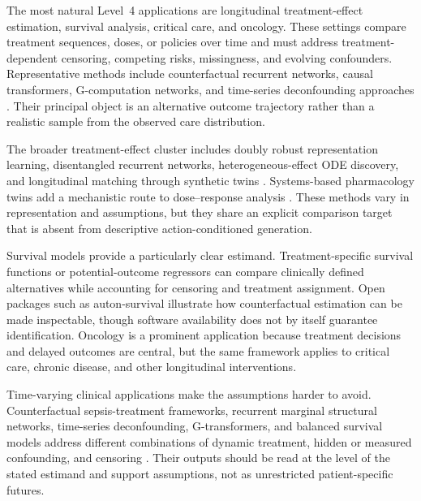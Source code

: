 The most natural Level~4 applications are longitudinal treatment-effect estimation, survival analysis, critical care, and oncology. These settings compare treatment sequences, doses, or policies over time and must address treatment-dependent censoring, competing risks, missingness, and evolving confounders. Representative methods include counterfactual recurrent networks, causal transformers, G-computation networks, and time-series deconfounding approaches \citep{Bica2020CRN,Melnychuk2022CausalTransformer,Li2020GNet,Seedat2022TECDE}. Their principal object is an alternative outcome trajectory rather than a realistic sample from the observed care distribution.

The broader treatment-effect cluster includes doubly robust representation learning, disentangled recurrent networks, heterogeneous-effect ODE discovery, and longitudinal matching through synthetic twins \citep{Zeng2020DoubleRobustRepresentation,Berrevoets2021DisentangledCounterfactualRecurrent,Kacprzyk2024OdeDiscoveryLongitudinal,Qian2021SynctwinTreatmentEffect}. Systems-based pharmacology twins add a mechanistic route to dose--response analysis \citep{Susilo2023Systemsbaseddigital}. These methods vary in representation and assumptions, but they share an explicit comparison target that is absent from descriptive action-conditioned generation.

Survival models provide a particularly clear estimand. Treatment-specific survival functions or potential-outcome regressors can compare clinically defined alternatives while accounting for censoring and treatment assignment. Open packages such as auton-survival illustrate how counterfactual estimation can be made inspectable, though software availability does not by itself guarantee identification. Oncology is a prominent application because treatment decisions and delayed outcomes are central, but the same framework applies to critical care, chronic disease, and other longitudinal interventions.

Time-varying clinical applications make the assumptions harder to avoid. Counterfactual sepsis-treatment frameworks, recurrent marginal structural networks, time-series deconfounding, G-transformers, and balanced survival models address different combinations of dynamic treatment, hidden or measured confounding, and censoring \citep{Jeter2021LearningTreatHypotensive,Lim2018ForecastingTreatmentResponses,Bica2020TimeSeriesDeconfounder,Xiong2024GTransformerCounterfactual,Chapfuwa2021EnablingCounterfactualSurvival,Nagpal2022autonsurvivalOpen}. Their outputs should be read at the level of the stated estimand and support assumptions, not as unrestricted patient-specific futures.

